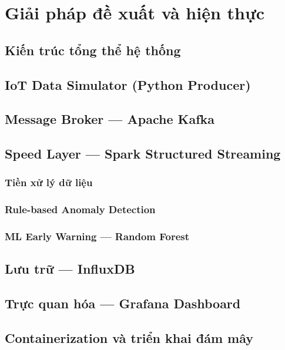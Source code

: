 \section{Giải pháp đề xuất và hiện thực}

\subsection{Kiến trúc tổng thể hệ thống}


\subsection{IoT Data Simulator (Python Producer)}


\subsection{Message Broker — Apache Kafka}


\subsection{Speed Layer — Spark Structured Streaming}

\subsubsection{Tiền xử lý dữ liệu}


\subsubsection{Rule-based Anomaly Detection}


\subsubsection{ML Early Warning — Random Forest}


\subsection{Lưu trữ — InfluxDB}


\subsection{Trực quan hóa — Grafana Dashboard}


\subsection{Containerization và triển khai đám mây}

